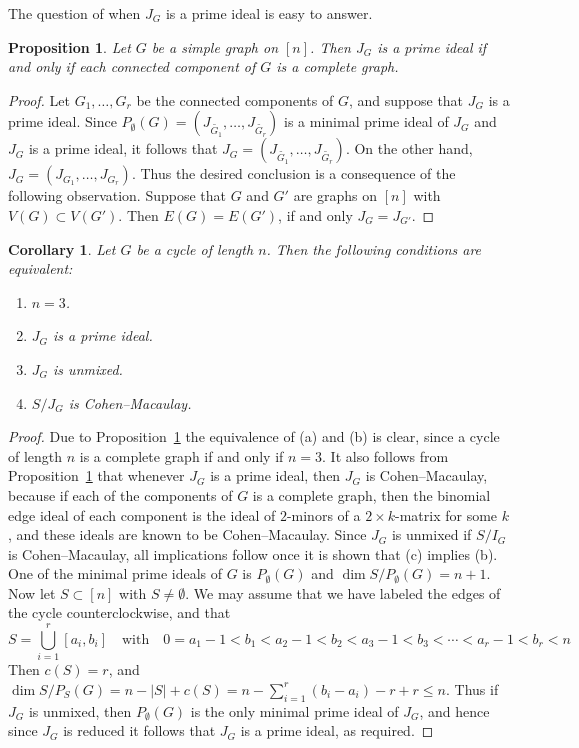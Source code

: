 \documentclass[11pt]{amsart}
\let\Union=\bigcup
\newtheorem{Corollary}[Theorem]{Corollary}
\newtheorem{Proposition}[Theorem]{Proposition}
\begin{document}
The question of when $J_G$ is a prime ideal is easy to answer.


\begin{Proposition}
\label{beingadomain}
Let $G$ be a simple graph on $[n]$. Then $J_G$ is a prime ideal if and only if each connected component of $G$ is a complete graph.
\end{Proposition}

\begin{proof}
Let $G_1,\ldots,G_r$ be the connected components of $G$, and suppose that $J_G$ is a prime ideal. Since $P_\emptyset(G)=(J_{\tilde{G_1}},\ldots, J_{\tilde{G_r}})$ is a minimal prime ideal of $J_G$ and $J_G$ is a prime ideal, it follows that $J_G=(J_{\tilde{G_1}},\ldots, J_{\tilde{G_r}})$. On the other hand, $J_G=(J_{G_1},\ldots, J_{G_r})$. Thus the desired conclusion is a consequence of the following observation. Suppose that  $G$ and $G'$ are graphs on $[n]$ with $V(G)\subset V(G')$. Then $E(G)=E(G')$, if and only $J_G=J_{G'}$.
\end{proof}


\begin{Corollary}
\label{cycle}
Let $G$ be a cycle of length $n$. Then the following conditions are equivalent:
\begin{enumerate}
\item[{\em (a)}] $n=3$.
\item[{\em (b)}] $J_G$ is a prime ideal.
\item[{\em (c)}] $J_G$ is unmixed.
\item[{\em (d)}] $S/J_G$ is Cohen--Macaulay.
\end{enumerate}
\end{Corollary}

\begin{proof}
Due to Proposition~\ref{beingadomain} the equivalence of (a) and (b) is clear, since a cycle of length $n$ is a complete graph if and only if $n=3$. It also follows from   Proposition~\ref{beingadomain}  that whenever $J_G$ is a prime ideal, then $J_G$ is Cohen--Macaulay, because if each of the components of $G$ is a complete graph, then the binomial edge ideal of each component is the ideal of $2$-minors of a $2\times k$-matrix for some $k$, and these ideals are known to be Cohen--Macaulay. Since $J_G$ is unmixed if $S/I_G$ is Cohen--Macaulay, all implications follow once it is  shown that (c) implies (b). One of the minimal prime ideals of $G$ is $P_{\emptyset}(G)$ and $\dim S/P_{\emptyset}(G)=n+1$. Now let $S\subset [n]$ with $S\neq \emptyset$. We may assume that we have labeled the edges of the cycle counterclockwise, and that
\[
S=\Union_{i=1}^r[a_i,b_i]\quad \text{with}\quad 0= a_1-1< b_1<a_2-1< b_2<a_3-1< b_3<\cdots <a_r-1< b_r< n
\]
Then $c(S)=r$, and $\dim S/P_S(G)=n-|S|+c(S)=n-\sum_{i=1}^r(b_i-a_i)-r+r\leq n$. Thus if $J_G$ is unmixed, then $P_{\emptyset}(G)$ is the only minimal prime ideal of $J_G$, and hence since $J_G$ is reduced it follows that $J_G$ is a prime ideal, as required.
\end{proof}
\end{document}
